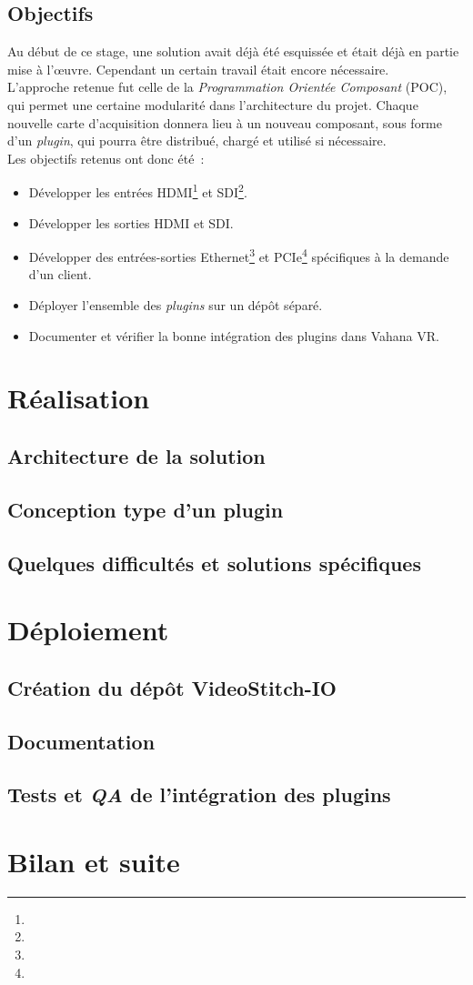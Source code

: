 \subsection{Objectifs}
Au début de ce stage, une solution avait déjà été esquissée et était déjà en partie
mise à l'\oe uvre. Cependant un certain travail était encore nécessaire.\\
L'approche retenue fut celle de la \emph{Programmation Orientée Composant} (POC),
qui permet une certaine modularité dans l'architecture du projet. Chaque nouvelle
carte d'acquisition donnera lieu à un nouveau composant, sous forme d'un \textit{plugin},
qui pourra être distribué, chargé et utilisé si nécessaire\cite{plugin}.\\
\newline
Les objectifs retenus ont donc été~:
\begin{itemize}
  \item Développer les entrées HDMI\footnote{} et SDI\footnote{}.
  \item Développer les sorties HDMI et SDI.
  \item Développer des entrées-sorties Ethernet\footnote{} et PCIe\footnote{} 
  spécifiques à la demande d'un client.
  \item Déployer l'ensemble des \textit{plugins} sur un dépôt séparé.
  \item Documenter et vérifier la bonne intégration des plugins dans Vahana VR.
\end{itemize}


\section{Réalisation}
\subsection{Architecture de la solution}

\subsection{Conception type d'un plugin}

\subsection{Quelques difficultés et solutions spécifiques}


\section{Déploiement}
\subsection{Création du dépôt VideoStitch-IO}

\subsection{Documentation}

\subsection{Tests et \textit{QA} de l'intégration des plugins}


\section{Bilan et suite}


